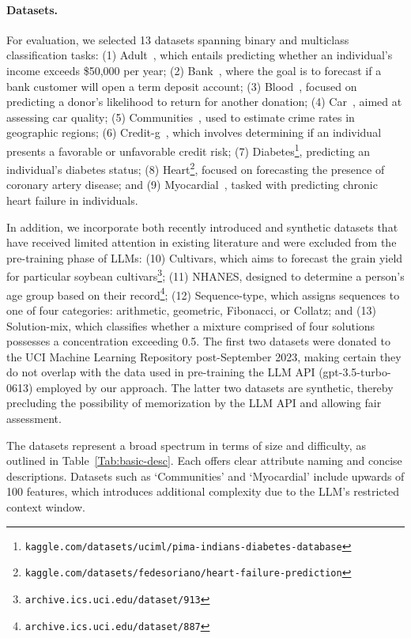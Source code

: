 \paragraph{Datasets.}
For evaluation, we selected 13 datasets spanning binary and multiclass classification tasks: (1) Adult~\cite{asuncion2007uci}, which entails predicting whether an individual's income exceeds \$50,000 per year; (2) Bank~\cite{moro2014data}, where the goal is to forecast if a bank customer will open a term deposit account; (3) Blood~\cite{yeh2009knowledge}, focused on predicting a donor’s likelihood to return for another donation; (4) Car~\cite{kadra2021well}, aimed at assessing car quality; (5) Communities~\cite{misc_communities_and_crime_183}, used to estimate crime rates in geographic regions; (6) Credit-g~\cite{kadra2021well}, which involves determining if an individual presents a favorable or unfavorable credit risk; (7) Diabetes\footnote{\texttt{kaggle.com/datasets/uciml/pima-indians-diabetes-database}}, predicting an individual’s diabetes status; (8) Heart\footnote{\texttt{kaggle.com/datasets/fedesoriano/heart-failure-prediction}}, focused on forecasting the presence of coronary artery disease; and (9) Myocardial~\cite{misc_myocardial_infarction_complications_579}, tasked with predicting chronic heart failure in individuals.

In addition, we incorporate both recently introduced and synthetic datasets that have received limited attention in existing literature and were excluded from the pre-training phase of LLMs: (10) Cultivars, which aims to forecast the grain yield for particular soybean cultivars\footnote{\texttt{archive.ics.uci.edu/dataset/913}}; (11) NHANES, designed to determine a person's age group based on their record\footnote{\texttt{archive.ics.uci.edu/dataset/887}}; (12) Sequence-type, which assigns sequences to one of four categories: arithmetic, geometric, Fibonacci, or Collatz; and (13) Solution-mix, which classifies whether a mixture comprised of four solutions possesses a concentration exceeding 0.5. The first two datasets were donated to the UCI Machine Learning Repository post-September 2023, making certain they do not overlap with the data used in pre-training the LLM API (gpt-3.5-turbo-0613) employed by our approach. The latter two datasets are synthetic, thereby precluding the possibility of memorization by the LLM API and allowing fair assessment.

The datasets represent a broad spectrum in terms of size and difficulty, as outlined in Table~\ref{Tab:basic-desc}. Each offers clear attribute naming and concise descriptions. Datasets such as `Communities' and `Myocardial' include upwards of 100 features, which introduces additional complexity due to the LLM’s restricted context window.

